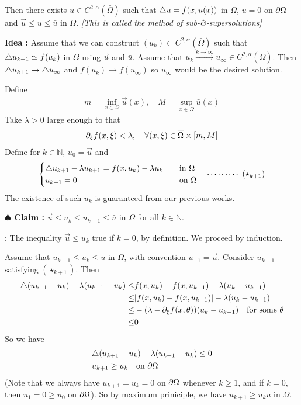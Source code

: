 \documentclass[12pt,a4paper]{article}
\newenvironment{proof}
{\begin{changemargin}{1cm}{0.5cm} 
	}%
	{\end{changemargin}
}
\newenvironment{subproof}
{\begin{changemargin}{0.5cm}{0.5cm} 
	}%
	{\end{changemargin}
}
\newenvironment{p}
{\begin{proof} 
	}%
	{\end{proof}
}
\begin{document}
Then there exists $u\in C^{2, \alpha}(\bar{\Omega})$ such that $\triangle u = f(x,u(x))$ in $\Omega$, $u=0$ on $\partial \Omega$ and $\vec{u}\leq u\leq \bar{u}$ in $\Omega$.
\emph{[This is called the method of sub-\&-supersolutions]}
\begin{p}
\textbf{Idea :} Assume that we can construct $(u_k)\subset C^{2, \alpha}(\bar{\Omega})$ such that $\triangle u_{k+1} \simeq f(u_k)$ in $\Omega$ using $\vec{u}$ and $\bar{u}$. Assume that $u_k \xrightarrow{k\rightarrow \infty} u_{\infty} \in C^{2, \alpha}(\bar{\Omega})$. Then $\triangle u_{k+1} \rightarrow \triangle u_{\infty}$ and $f(u_k) \rightarrow f(u_{\infty})$ so $u_{\infty}$ would be the desired solution.
\s

\pf Define
\begin{align*}
m= \inf_{x\in \Omega} \vec{u}(x), \quad M = \sup_{x\in \Omega} \bar{u}(x)
\end{align*}
Take $\lambda >0$ large enough to that
\begin{align*}
\partial_{\xi} f(x,\xi) < \lambda, \quad \forall (x, \xi) \in \overline{\Omega} \times [m, M]
\end{align*}
Define for $k\in \mathbb{N}$, $u_0 = \vec{u}$ and
\begin{align*}
\begin{cases}
\triangle u_{k+1} - \lambda u_{k+1} = f(x, u_k) - \lambda u_k \quad & \text{in }\Omega \\
u_{k+1} =0 \quad & \text{on }\Omega
\end{cases} \quad \cdots\cdots\cdots\,\,(\star_{k+1})
\end{align*}
The existence of such $u_k$ is guaranteed from our previous works.

\textbf{$\spadesuit$ Claim :} $\vec{u} \leq u_k \leq u_{k+1} \leq \bar{u}$ in $\Omega$ for all $k \in \mathbb{N}$.
\begin{subproof}
: The inequality $\vec{u} \leq u_k$ true if $k=0$, by definition. We proceed by induction.

\quad Assume that $u_{k-1} \leq u_k \leq \bar{u}$ in $\Omega$, with convention $u_{-1} = \vec{u}$. Consider $u_{k+1}$ satisfying $(\star_{k+1})$. Then
\begin{align*}
\triangle (u_{k+1} - u_k) - \lambda(u_{k+1}- u_k) \leq & f(x, u_k) - f(x, u_{k-1}) - \lambda(u_k - u_{k-1}) \\
\leq & |f(x, u_k) - f(x, u_{k-1})| - \lambda(u_k- u_{k-1}) \\
\leq & -(\lambda - \partial_{\xi} f(x, \theta)) (u_k - u_{k-1}) \quad \text{for some }\theta \\
\leq & 0
\end{align*}
So we have
\begin{align*}
& \triangle(u_{k+1} - u_{k}) - \lambda(u_{k+1}- u_{k}) \leq 0 \\
& u_{k+1} \geq u_k  \quad \text{on } \partial \Omega
\end{align*}
(Note that we always have $u_{k+1} = u_k =0$ on $\partial \Omega$ whenever $k\geq 1$, and if $k=0$, then $u_1 =0 \geq u_0$ on $\partial \Omega$). So by maximum priniciple, we have $u_{k+1} \geq u_k{u}$ in $\Omega$.


\end{subproof}
\end{p}
\end{document}
